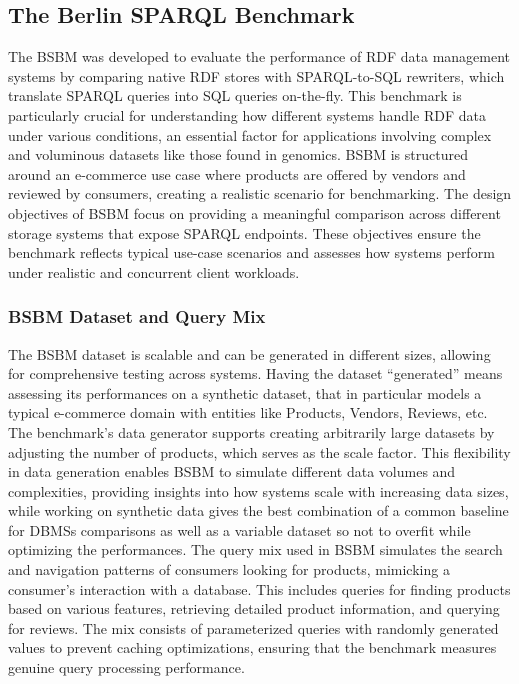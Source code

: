 \subsection{The Berlin SPARQL Benchmark}
The \ac{BSBM} \cite{DBLP:journals/ijswis/BizerS09} was developed to evaluate the performance of \ac{RDF} data management systems by comparing native \ac{RDF} stores with \ac{SPARQL}-to-SQL rewriters, which translate \ac{SPARQL} queries into \ac{SQL} queries on-the-fly. This benchmark is particularly crucial for understanding how different systems handle \ac{RDF} data under various conditions, an essential factor for applications involving complex and voluminous datasets like those found in genomics.
\ac{BSBM} is structured around an e-commerce use case where products are offered by vendors and reviewed by consumers, creating a realistic scenario for benchmarking. The design objectives of \ac{BSBM} focus on providing a meaningful comparison across different storage systems that expose \ac{SPARQL} endpoints. These objectives ensure the benchmark reflects typical use-case scenarios and assesses how systems perform under realistic and concurrent client workloads.
\subsubsection{BSBM Dataset and Query Mix}
The \ac{BSBM} dataset is scalable and can be generated in different sizes, allowing for comprehensive testing across systems. Having the dataset “generated” means assessing its performances on a synthetic dataset, that in particular models a typical e-commerce domain with entities like Products, Vendors, Reviews, etc. The benchmark's data generator supports creating arbitrarily large datasets by adjusting the number of products, which serves as the scale factor. This flexibility in data generation enables \ac{BSBM} to simulate different data volumes and complexities, providing insights into how systems scale with increasing data sizes, while working on synthetic data gives the best combination of a common baseline for \ac{DBMS}s comparisons as well as a variable dataset so not to overfit while optimizing the performances.
The query mix used in \ac{BSBM} simulates the search and navigation patterns of consumers looking for products, mimicking a consumer's interaction with a database. This includes queries for finding products based on various features, retrieving detailed product information, and querying for reviews. The mix consists of parameterized queries with randomly generated values to prevent caching optimizations, ensuring that the benchmark measures genuine query processing performance.
